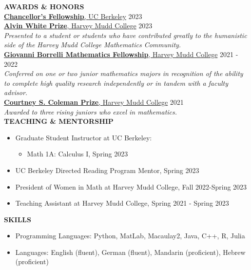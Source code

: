 \documentclass[11pt]{article}
\newcommand{\hdr}[1]{\textcolor{blue(ryb)}{\textbf{#1}}}
\newcommand{\role}[3]{\underline{\textbf{#1}, {#2}} \hfill #3}
\begin{document}
\medskip
\hdr{AWARDS \& HONORS}\\
\role{Chancellor's Fellowship}{UC Berkeley}{2023}\\
\role{Alvin White Prize}{Harvey Mudd College}{2023}\\
\textit{Presented to a student or students who have contributed greatly to the humanistic side of the Harvey Mudd College Mathematics Community.}\\
\role{Giovanni Borrelli Mathematics Fellowship}{Harvey Mudd College}{2021 - 2022}\\
\textit{Conferred on one or two junior mathematics majors in recognition of the ability to complete high quality research independently or in tandem with a faculty advisor.}\\
\role{Courtney S. Coleman Prize}{Harvey Mudd College}{2021}\\
\textit{Awarded to three rising juniors who excel in mathematics.}\\
\hdr{TEACHING \& MENTORSHIP}\\
\begin{itemize}
\item Graduate Student Instructor at UC Berkeley:
  \begin{itemize}
  \item Math 1A: Calculus I, Spring 2023
  \end{itemize}
\item UC Berkeley Directed Reading Program Mentor, Spring 2023
\item President of Women in Math at Harvey Mudd College, Fall 2022-Spring 2023
\item Teaching Assistant at Harvey Mudd College, Spring 2021 - Spring 2023
\end{itemize}
\hdr{SKILLS}\\
\begin{itemize}
\item 
Programming Languages: Python, MatLab, Macaulay2, Java, C++, R, Julia\\
\item 
Languages: English (fluent), German (fluent), Mandarin (proficient), Hebrew (proficient)
\end{itemize}
\end{document}
